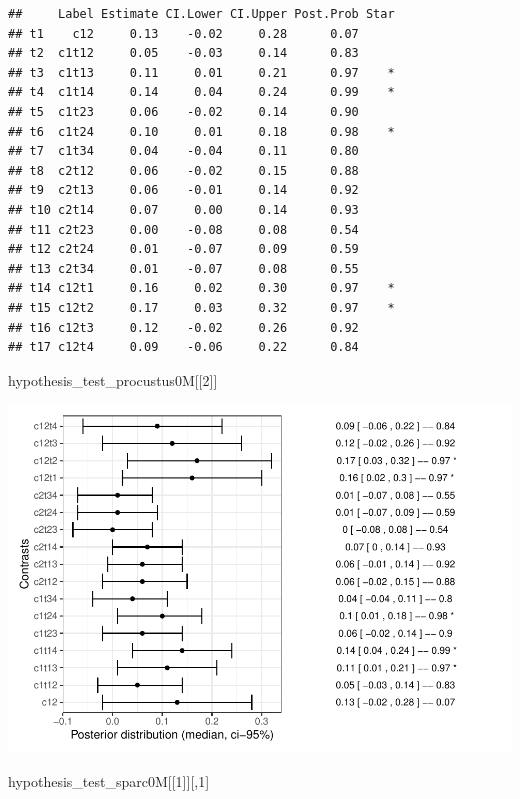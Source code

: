 \documentclass[
]{article}
\newenvironment{Shaded}{\begin{snugshade}}{\end{snugshade}}
\newcommand{\DecValTok}[1]{\textcolor[rgb]{0.00,0.00,0.81}{#1}}
\newcommand{\NormalTok}[1]{#1}
\begin{document}
\begin{verbatim}
##     Label Estimate CI.Lower CI.Upper Post.Prob Star
## t1    c12     0.13    -0.02     0.28      0.07     
## t2  c1t12     0.05    -0.03     0.14      0.83     
## t3  c1t13     0.11     0.01     0.21      0.97    *
## t4  c1t14     0.14     0.04     0.24      0.99    *
## t5  c1t23     0.06    -0.02     0.14      0.90     
## t6  c1t24     0.10     0.01     0.18      0.98    *
## t7  c1t34     0.04    -0.04     0.11      0.80     
## t8  c2t12     0.06    -0.02     0.15      0.88     
## t9  c2t13     0.06    -0.01     0.14      0.92     
## t10 c2t14     0.07     0.00     0.14      0.93     
## t11 c2t23     0.00    -0.08     0.08      0.54     
## t12 c2t24     0.01    -0.07     0.09      0.59     
## t13 c2t34     0.01    -0.07     0.08      0.55     
## t14 c12t1     0.16     0.02     0.30      0.97    *
## t15 c12t2     0.17     0.03     0.32      0.97    *
## t16 c12t3     0.12    -0.02     0.26      0.92     
## t17 c12t4     0.09    -0.06     0.22      0.84
\end{verbatim}

\begin{Shaded}
\begin{Highlighting}[]
\NormalTok{hypothesis\_test\_procustus0M[[}\DecValTok{2}\NormalTok{]]}
\end{Highlighting}
\end{Shaded}

\includegraphics{08_Publish_GUSO_ASIL_files/figure-latex/Contrasts0M-1.pdf}

\begin{Shaded}
\begin{Highlighting}[]
\NormalTok{hypothesis\_test\_sparc0M[[}\DecValTok{1}\NormalTok{]][,}\DecValTok{1}\NormalTok{]}
\end{Highlighting}
\end{Shaded}
\end{document}
